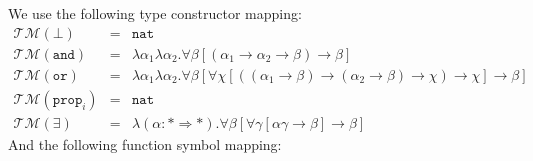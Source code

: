 \documentclass[runningheads,a4paper]{llncs}
\newcommand{\Typemap}{\mathcal{T\!M}}
\newcommand{\quant}[2]{\forall #1[#2]}
\newcommand{\arrtype}{\rightarrow}
\newcommand{\arrkind}{\Rightarrow}
\newcommand{\nat}{\mathtt{nat}}
\begin{document}
We use the following type constructor mapping:
\[
\begin{array}{rcl}
\Typemap(\bot) & = & \nat \\
\Typemap(\mathtt{and}) & = & \lambda\alpha_1\lambda\alpha_2 .
  \quant{\beta}{(\alpha_1 \arrtype \alpha_2 \arrtype \beta) \arrtype
  \beta} \\
\Typemap(\mathtt{or}) & = & \lambda\alpha_1\lambda\alpha_2 .
  \quant{\beta}{\quant{\chi}{((\alpha_1 \arrtype \beta) \arrtype (\alpha_2
  \arrtype \beta) \arrtype \chi) \arrtype \chi} \arrtype \beta} \\
\Typemap(\mathtt{prop}_i) & = & \nat \\
\Typemap(\exists) & = & \lambda(\alpha : * \arrkind *) . \quant{\beta}{\quant{\gamma}{\alpha\gamma \arrtype \beta} \arrtype \beta}
\end{array}
\]
And the following function symbol mapping:
\end{document}
